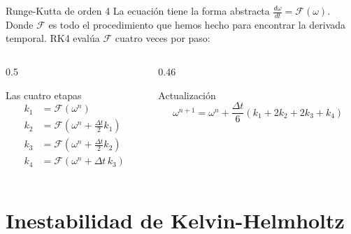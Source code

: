 \documentclass[aspectratio=169, 12pt]{beamer}
\begin{document}
\begin{frame}{Runge-Kutta de orden 4}
  La ecuación tiene la forma abstracta $\frac{d\omega}{d t} = \mathcal{F}(\omega)$. Donde $\mathcal{F}$ es todo el procedimiento que hemos hecho para encontrar la derivada temporal.
  RK4 evalúa $\mathcal{F}$ cuatro veces por paso:

  \begin{columns}
    \begin{column}{0.5\textwidth}
      \begin{block}{Las cuatro etapas}
        \begin{align*}
          k_1 &= \mathcal{F}(\omega^n)\\[4pt]
          k_2 &= \mathcal{F}\!\left(\omega^n + \tfrac{\Delta t}{2}k_1\right)\\[4pt]
          k_3 &= \mathcal{F}\!\left(\omega^n + \tfrac{\Delta t}{2}k_2\right)\\[4pt]
          k_4 &= \mathcal{F}(\omega^n + \Delta t\,k_3)
        \end{align*}
      \end{block}
    \end{column}
    \begin{column}{0.46\textwidth}
      \begin{alertblock}{Actualización}
        \[
          \omega^{n+1} = \omega^n +
          \frac{\Delta t}{6}(k_1 + 2k_2 + 2k_3 + k_4)
        \]
      \end{alertblock}

    \end{column}
  \end{columns}

\end{frame}

\section{Inestabilidad de Kelvin-Helmholtz}
\end{document}
